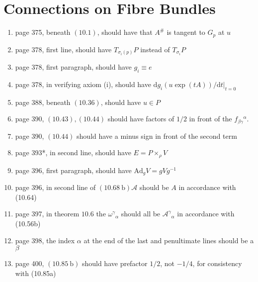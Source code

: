 \documentclass{article}
\begin{document}
\section*{Connections on Fibre Bundles}

\begin{enumerate}
  
\item page 375, beneath $(10.1)$, should have that $A^{\#}$ is tangent to $G_{p}$ at $u$

\item page 378, first line, should have $T_{\sigma_{i}(p)} P$ instead of $T_{\sigma_{i}} P$

\item page 378, first paragraph, should have $g_{i} \equiv e$

\item page 378, in verifying axiom (i), should have $\mathrm{d} g_{i}(u \exp (t A)) /\left.\mathrm{d} t\right|_{t=0}$

\item page 388, beneath $(10.36)$, should have $u \in P$

\item page 390, $(10.43),(10.44)$ should have factors of $1 / 2$ in front of the $f_{\beta \gamma}{ }^{\alpha}$.

\item page 390, $(10.44)$ should have a minus sign in front of the second term

\item page 393*, in second line, should have $E=P \times_{\rho} V$

\item page 396, first paragraph, should have $\mathrm{Ad}_{g} V=g V g^{-1}$

\item page 396, in second line of $(10.68 \mathrm{~b}) \mathcal{A}$ should be $A$ in accordance with (10.64)

\item page 397, in theorem $10.6$ the $\omega^{\gamma}{}_{\alpha}$ should all be $\mathcal{A}^{\gamma}{}_{\alpha}$ in accordance with (10.56b)

\item page 398, the index $\alpha$ at the end of the last and penultimate lines should be a $\beta$

\item page 400, $(10.85 \mathrm{~b})$ should have prefactor $1 / 2$, not $-1 / 4$, for consistency with (10.85a)


\end{enumerate}
\end{document}
